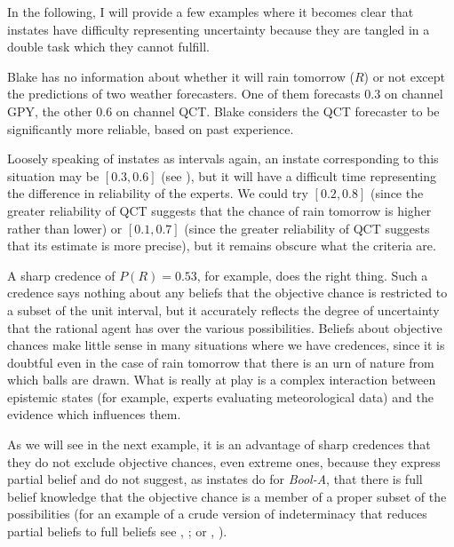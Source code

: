 \documentclass[11pt]{article}
\newcommand{\anderson}[0]{\textit{Bool-A}}
\begin{document}
In the following, I will provide a few examples where it becomes clear
that instates have difficulty representing uncertainty because they
are tangled in a double task which they cannot fulfill.

\begin{quotex}
  \label{ex:aggreg} Blake has no
  information about whether it will rain tomorrow ($R$) or not except
  the predictions of two weather forecasters. One of them forecasts
  0.3 on channel GPY, the other 0.6 on channel QCT. Blake considers
  the QCT forecaster to be significantly more reliable, based on past
  experience.
\end{quotex}

Loosely speaking of instates as intervals again, an instate
corresponding to this situation may be $[0.3,0.6]$ (see
), but it will have a difficult time
representing the difference in reliability of the experts. We could
try $[0.2,0.8]$ (since the greater reliability of QCT suggests that
the chance of rain tomorrow is higher rather than lower) or
$[0.1,0.7]$ (since the greater reliability of QCT suggests that its
estimate is more precise), but it remains obscure what the criteria
are.

A sharp credence of $P(R)=0.53$, for example, does the right thing.
Such a credence says nothing about any beliefs that the objective
chance is restricted to a subset of the unit interval, but it
accurately reflects the degree of uncertainty that the rational agent
has over the various possibilities. Beliefs about objective chances
make little sense in many situations where we have credences, since it
is doubtful even in the case of rain tomorrow that there is an urn of
nature from which balls are drawn. What is really at play is a complex
interaction between epistemic states (for example, experts evaluating
meteorological data) and the evidence which influences them.

As we will see in the next example, it is an advantage of sharp
credences that they do not exclude objective chances, even extreme
ones, because they express partial belief and do not suggest, as
instates do for {\anderson}, that there is full belief knowledge
that the objective chance is a member of a proper subset of the
possibilities (for an example of a crude version of indeterminacy that
reduces partial beliefs to full beliefs see ,
; or ,
).
\end{document}
